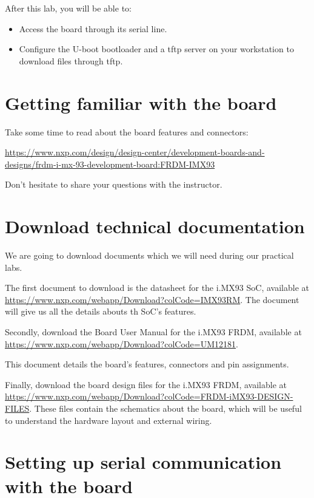 
After this lab, you will be able to:
\begin{itemize}
\item Access the board through its serial line.
\item Configure the U-boot bootloader and a tftp server
      on your workstation to download files through tftp.
\end{itemize}

\section{Getting familiar with the board}

Take some time to read about the board features and connectors:

\url{https://www.nxp.com/design/design-center/development-boards-and-designs/frdm-i-mx-93-development-board:FRDM-IMX93}

Don't hesitate to share your questions with the instructor.

\section{Download technical documentation}

We are going to download documents which we will need during our
practical labs.

The first document to download is the datasheet for the
i.MX93 SoC, available at
\url{https://www.nxp.com/webapp/Download?colCode=IMX93RM}. The document
will
give us all the details abouts th SoC's features.

Secondly, download the Board User Manual for
the i.MX93 FRDM, available at
\url{https://www.nxp.com/webapp/Download?colCode=UM12181}.

This document details the board's features, connectors and pin
assignments.

Finally, download the board design files for the i.MX93 FRDM, available
at
\url{https://www.nxp.com/webapp/Download?colCode=FRDM-iMX93-DESIGN-FILES}.
These files contain the schematics about the board, which will be
useful to understand the hardware layout and external wiring.

\section{Setting up serial communication with the board}

